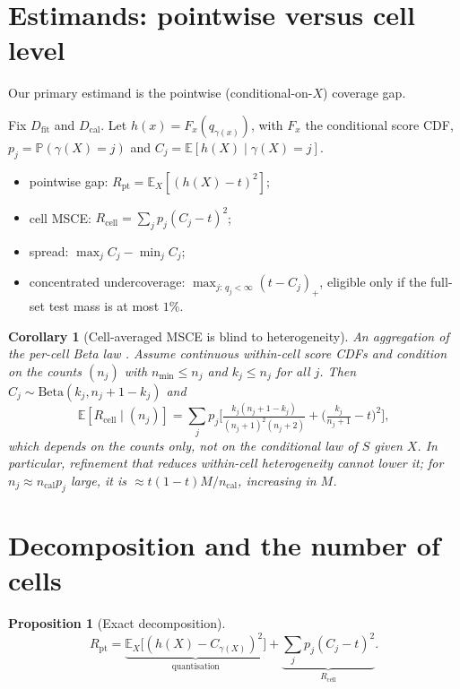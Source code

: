 \documentclass[twoside]{article}
\newtheorem{proposition}[theorem]{Proposition}
\newtheorem{corollary}[theorem]{Corollary}
\theoremstyle{definition}
\theoremstyle{remark}
\newcommand{\Dfit}{D_{\mathrm{fit}}}
\newcommand{\Dcal}{D_{\mathrm{cal}}}
\newcommand{\E}{\mathbb{E}}
\renewcommand{\P}{\mathbb{P}}
\newcommand{\1}{\mathbf{1}}
\begin{document}
\section{Estimands: pointwise versus cell level}
\label{sec:estimands}
Our primary estimand is the pointwise (conditional-on-$X$) coverage gap.

Fix $\Dfit$ and $\Dcal$. Let $h(x) = F_x(q_{\gamma(x)})$, with $F_x$ the conditional score
CDF, $p_j=\P(\gamma(X)=j)$ and $C_j = \E[h(X)\mid\gamma(X)=j]$.
\begin{itemize}
  \item pointwise gap: $R_{\mathrm{pt}} = \E_X[(h(X)-t)^2]$;
  \item cell MSCE: $R_{\mathrm{cell}} = \textstyle\sum_j p_j (C_j-t)^2$;
  \item spread: $\max_j C_j - \min_j C_j$;
  \item concentrated undercoverage: $\max_{j:\,q_j<\infty} (t-C_j)_+$, eligible only if the full-set
  test mass is at most $1\%$.
\end{itemize}

\begin{corollary}[Cell-averaged MSCE is blind to heterogeneity]
\label{cor:B0}
An aggregation of the per-cell Beta law \citep{vovk2012conditional,ding2023class}. Assume continuous within-cell score CDFs and condition on the counts $(n_j)$ with
$n_{\min}\le n_j$ and $k_j\le n_j$ for all $j$. Then $C_j\sim\mathrm{Beta}(k_j,n_j+1-k_j)$
and
\[
  \E[R_{\mathrm{cell}}\mid (n_j)] = \sum_j p_j\Big[\tfrac{k_j(n_j+1-k_j)}{(n_j+1)^2(n_j+2)}
   + \big(\tfrac{k_j}{n_j+1}-t\big)^2\Big],
\]
which depends on the counts only, not on the conditional law of $S$ given $X$. In
particular, refinement that reduces within-cell heterogeneity cannot lower it; for
$n_j\approx n_{\mathrm{cal}}p_j$ large, it is $\approx t(1-t)M/n_{\mathrm{cal}}$, increasing
in $M$.
\end{corollary}

\section{Decomposition and the number of cells}
\label{sec:decomp}

\begin{proposition}[Exact decomposition]
\label{prop:decomp}
\[
  R_{\mathrm{pt}} = \underbrace{\E_X\big[(h(X)-C_{\gamma(X)})^2\big]}_{\text{quantisation}}
  + \underbrace{\textstyle\sum_j p_j (C_j-t)^2}_{R_{\mathrm{cell}}}.
\]
\end{proposition}
\end{document}
